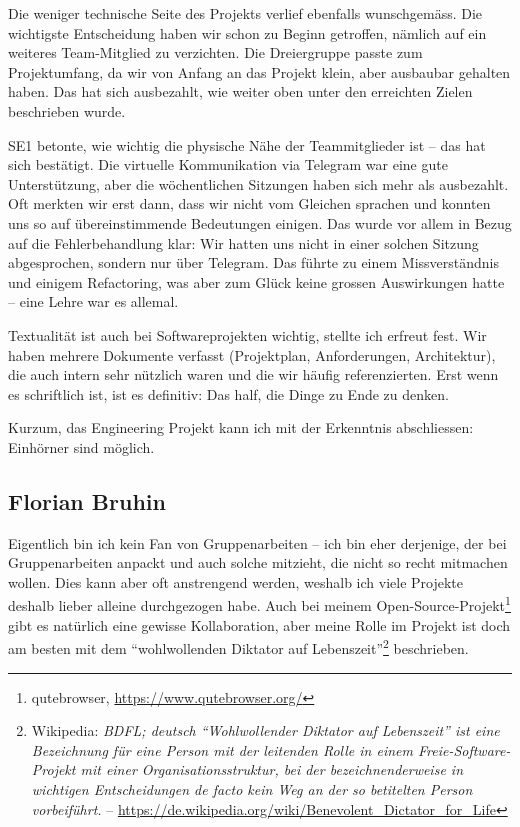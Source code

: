 \documentclass[a4paper]{article}
\begin{document}
Die weniger technische Seite des Projekts verlief ebenfalls wunschgemäss. Die wichtigste Entscheidung haben wir schon zu Beginn getroffen, nämlich auf ein weiteres Team-Mitglied zu verzichten. Die Dreiergruppe passte zum Projektumfang, da wir von Anfang an das Projekt klein, aber ausbaubar gehalten haben. Das hat sich ausbezahlt, wie weiter oben unter den erreichten Zielen beschrieben wurde.

SE1 betonte, wie wichtig die physische Nähe der Teammitglieder ist -- das hat sich bestätigt. Die virtuelle Kommunikation via Telegram war eine gute Unterstützung, aber die wöchentlichen Sitzungen haben sich mehr als ausbezahlt. Oft merkten wir erst dann, dass wir nicht vom Gleichen sprachen und konnten uns so auf übereinstimmende Bedeutungen einigen. Das wurde vor allem in Bezug auf die Fehlerbehandlung klar: Wir hatten uns nicht in einer solchen Sitzung abgesprochen, sondern nur über Telegram. Das führte zu einem Missverständnis und einigem Refactoring, was aber zum Glück keine grossen Auswirkungen hatte -- eine Lehre war es allemal.

Textualität ist auch bei Softwareprojekten wichtig, stellte ich erfreut fest. Wir haben mehrere Dokumente verfasst (Projektplan, Anforderungen, Architektur), die auch intern sehr nützlich waren und die wir häufig referenzierten. Erst wenn es schriftlich ist, ist es definitiv: Das half, die Dinge zu Ende zu denken.

Kurzum, das Engineering Projekt kann ich mit der Erkenntnis abschliessen: Einhörner sind möglich.

\pagebreak

\subsection{Florian Bruhin}

Eigentlich bin ich kein Fan von Gruppenarbeiten -- ich bin eher derjenige, der
bei Gruppenarbeiten anpackt und auch solche mitzieht, die nicht so recht
mitmachen wollen. Dies kann aber oft anstrengend werden, weshalb ich viele Projekte
deshalb lieber alleine durchgezogen habe. Auch bei meinem
Open-Source-Projekt\footnote{qutebrowser, \url{https://www.qutebrowser.org/}}
gibt es natürlich eine gewisse Kollaboration, aber meine Rolle im Projekt ist
doch am besten mit dem ``wohlwollenden Diktator auf
Lebenszeit''\footnote{Wikipedia: \emph{BDFL; deutsch ``Wohlwollender Diktator auf Lebenszeit'' ist eine Bezeichnung für eine Person mit der leitenden Rolle in einem Freie-Software-Projekt mit einer Organisationsstruktur, bei der bezeichnenderweise in wichtigen Entscheidungen de facto kein Weg an der so betitelten Person vorbeiführt.} -- \url{https://de.wikipedia.org/wiki/Benevolent_Dictator_for_Life}} beschrieben.
\end{document}
